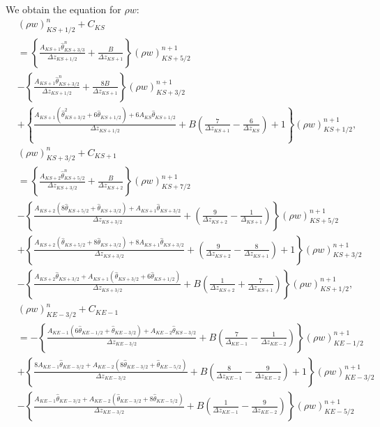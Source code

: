 We obtain the equation for $\rho w$:
\begin{align}
  & (\rho w)_{KS+1/2}^n + C_{KS} \nonumber \\
  &= \left\{\frac{A_{KS+1}\hat\theta_{KS+3/3}^n}{\Delta z_{KS+1/2}} + \frac{B}{\Delta z_{KS+1}}\right\} (\rho w)_{KS+5/2}^{n+1} \nonumber \\
  &- \left\{\frac{A_{KS+1}\hat\theta_{KS+3/2}^n}{\Delta z_{KS+1/2}} + \frac{8B}{\Delta z_{KS+1}}\right\} (\rho w)_{KS+3/2}^{n+1} \nonumber \\
  &+ \left\{\frac{A_{KS+1}(\hat\theta_{KS+3/2}^2+6\hat\theta_{KS+1/2}) + 6A_{KS}\hat\theta_{KS+1/2}}{\Delta z_{KS+1/2}} + B\left(\frac{7}{\Delta z_{KS+1}}-\frac{6}{\Delta z_{KS}}\right) + 1\right\} (\rho w)_{KS+1/2}^{n+1}, \\
  & (\rho w)_{KS+3/2}^n + C_{KS+1} \nonumber \\
  &= \left\{\frac{A_{KS+2}\hat\theta_{KS+5/2}^n}{\Delta z_{KS+3/2}} + \frac{B}{\Delta z_{KS+2}}\right\} (\rho w)_{KS+7/2}^{n+1} \nonumber \\
  &- \left\{\frac{A_{KS+2}(8\hat\theta_{KS+5/2}+\hat\theta_{KS+3/2})+A_{KS+1}\hat\theta_{KS+3/2}}{\Delta z_{KS+3/2}} + \left(\frac{9}{\Delta z_{KS+2}}-\frac{1}{\Delta_{KS+1}}\right)\right\} (\rho w)_{KS+5/2}^{n+1} \nonumber \\
  &+ \left\{\frac{A_{KS+2}(\hat\theta_{KS+5/2}+8\hat\theta_{KS+3/2})+8A_{KS+1}\hat\theta_{KS+3/2}}{\Delta z_{KS+3/2}} + \left(\frac{9}{\Delta z_{KS+2}}-\frac{8}{\Delta z_{KS+1}}\right) + 1\right\} (\rho w)_{KS+3/2}^{n+1} \nonumber \\
  &- \left\{\frac{A_{KS+2}\hat\theta_{KS+3/2}+A_{KS+1}(\hat\theta_{KS+3/2}+6\hat\theta_{KS+1/2})}{\Delta z_{KS+3/2}} + B \left(\frac{1}{\Delta z_{KS+2}}+\frac{7}{\Delta z_{KS+1}}\right)\right\} (\rho w)_{KS+1/2}^{n+1}, \\
  & (\rho w)_{KE-3/2}^n + C_{KE-1} \nonumber \\
  &= - \left\{\frac{A_{KE-1}(6\hat\theta_{KE-1/2}+\hat\theta_{KE-3/2})+A_{KE-2}\hat\theta_{KS-3/2}}{\Delta z_{KE-3/2}} + B\left(\frac{7}{\Delta_{KE-1}}-\frac{1}{\Delta z_{KE-2}}\right)\right\} (\rho w)_{KE-1/2}^{n+1} \nonumber \\
  &  + \left\{\frac{8A_{KE-1}\hat\theta_{KE-3/2}+A_{KE-2}(8\hat\theta_{KE-3/2}+\hat\theta_{KE-5/2})}{\Delta z_{KE-3/2}} + B\left(\frac{8}{\Delta z_{KE-1}}-\frac{9}{\Delta z_{KE-2}}\right) + 1 \right\} (\rho w)_{KE-3/2}^{n+1} \nonumber \\
  &  - \left\{\frac{A_{KE-1}\hat\theta_{KE-3/2}+A_{KE-2}(\hat\theta_{KE-3/2}+8\hat\theta_{KE-5/2})}{\Delta z_{KE-3/2}} + B\left(\frac{1}{\Delta z_{KE-1}}-\frac{9}{\Delta z_{KE-2}}\right)\right\} (\rho w)_{KE-5/2}^{n+1} \nonumber \\

\end{align}
